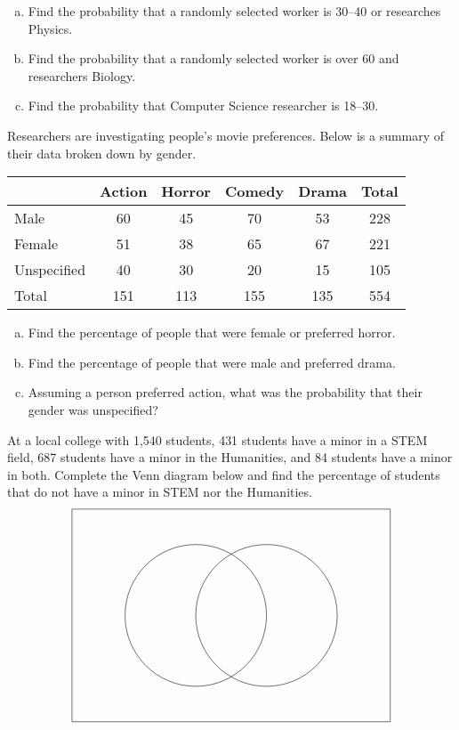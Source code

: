 \documentclass[12pt,letterpaper]{exam}
\begin{document}
\begin{questions}
\begin{enumerate}[(a)]
\item Find the probability that a randomly selected worker is 30--40 or researches Physics.
\item Find the probability that a randomly selected worker is over 60 and researchers Biology.
\item Find the probability that Computer Science researcher is 18--30. 
\end{enumerate}



\newpage
\question[10] Researchers are investigating people's movie preferences. Below is a summary of their data broken down by gender. \par
	\begin{table}[!ht]
	\centering
	\begin{tabular}{|l||c|c|c|c||c|} \hline
	& Action & Horror & Comedy & Drama & Total \\ \hline
	Male & 60 & 45 & 70 & 53 & 228 \\ \hline
	Female & 51 & 38 & 65 & 67 & 221 \\ \hline 
	Unspecified & 40 & 30 & 20 & 15 & 105 \\ \hline \hline
	Total & 151 & 113 & 155 & 135 & 554 \\ \hline
	\end{tabular}
	\end{table} \par

\begin{enumerate}[(a)]
\item Find the percentage of people that were female or preferred horror. 
\item Find the percentage of people that were male and preferred drama.
\item Assuming a person preferred action, what was the probability that their gender was unspecified? 
\end{enumerate}



\newpage
\question[10] At a local college with 1,540 students, 431 students have a minor in a STEM field, 687 students have a minor in the Humanities, and 84 students have a minor in both. Complete the Venn diagram below and find the percentage of students that do not have a minor in STEM nor the Humanities. 
	\[
	\begin{tikzpicture}
	\draw (0,0) rectangle (9,6);
	\draw (3.5,3) circle (2);
	\draw (5.5,3) circle (2);
	

\end{tikzpicture}\]
\end{questions}
\end{document}
